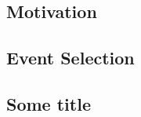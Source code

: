 \documentclass[10pt,twoside,cucitura,classica,english,openany]{toptesi}
\begin{document}
\section{Motivation}
\label{sec:motivation}



\section{Event Selection}
\label{sec:event-selection}



\begin{appendices}
  \chapter{Some title}
\end{appendices}

 \printbibliography
\end{document}
